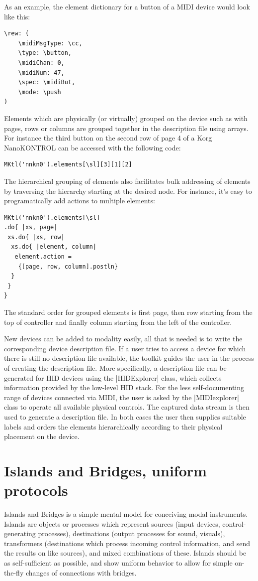 \documentclass{article}
\begin{document}
As an example, the element dictionary for a button of a MIDI device would look like this:
\begin{Verbatim}
\rew: (
	\midiMsgType: \cc,
	\type: \button,
	\midiChan: 0,
	\midiNum: 47,
	\spec: \midiBut,
	\mode: \push
)
\end{Verbatim}

Elements which are physically (or virtually) grouped on the device such as with pages, rows or columns are grouped together in the description file using arrays. For instance the third button on the second row of page 4 of a Korg NanoKONTROL can be accessed with the following code:

\begin{Verbatim}
MKtl('nnkn0').elements[\sl][3][1][2]
\end{Verbatim}

The hierarchical grouping of elements also facilitates bulk addressing of elements by traversing the hierarchy starting at the desired node. For instance, it's easy to programatically add actions to multiple elements:

\begin{Verbatim}
MKtl('nnkn0').elements[\sl]
.do{ |xs, page|
 xs.do{ |xs, row|
  xs.do{ |element, column|
   element.action = 
    {[page, row, column].postln}
  }
 }
}
\end{Verbatim}

The standard order for grouped elements is first page, then row starting from the top of controller and finally column starting from the left of the controller.

New devices can be added to modality easily, all that is needed is to write the corresponding device description file. 
If a user tries to access a device for which there is still no description file available, the toolkit guides the user in the process of creating the description file. 
More specifically, a description file can be generated for HID devices using the |HIDExplorer| class, which collects information provided by the low-level HID stack. 
For the less self-documenting range of devices connected via MIDI, the user is asked by the |MIDIexplorer| class to operate all available physical controls. 
The captured data stream is then used to generate a description file.
In both cases the user then supplies suitable labels and orders the elements hierarchically according to their physical placement on the device.

\section{Islands and Bridges, uniform protocols}
\label{sec:islands_and_bridges_uniform_protocols}
Islands and Bridges is a simple mental model for conceiving modal instruments. 
Islands are objects or processes which represent sources (input devices, control-generating processes), destinations (output processes for sound, visuals), transformers (destinations which process incoming control information, and send the results on like sources), and mixed combinations of these. 
Islands should be as self-sufficient as possible, and show uniform behavior to allow for simple on-the-fly changes of connections with bridges.
\end{document}

